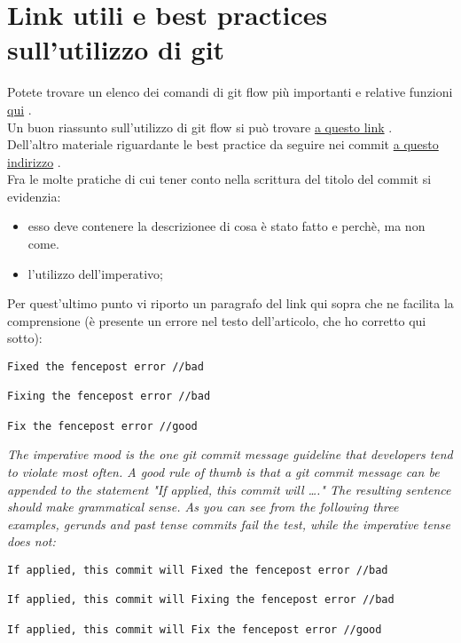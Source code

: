 \section{Link utili e best practices sull'utilizzo di git}
Potete trovare un elenco dei comandi di git flow più importanti e relative funzioni
\href{https://danielkummer.github.io/git-flow-cheatsheet/}{qui} \cite{GitFlowCheatseet}. \\
Un buon riassunto sull'utilizzo di git flow si può trovare \href{https://www.atlassian.com/git/tutorials/comparing-workflows/gitflow-workflow}{a questo link} \cite{GitFlowWorkflowTutorial}.\\
Dell'altro materiale riguardante le best practice da seguire nei commit \href{https://www.theserverside.com/video/Follow-these-git-commit-message-guidelines}{a questo indirizzo} \cite{GitCommitGuidelines}. \\
Fra le molte pratiche di cui tener conto nella scrittura del titolo del commit si evidenzia:
\begin{itemize}
\item esso deve contenere la descrizionee di cosa è stato fatto e perchè, ma non come.
\item l'utilizzo dell'imperativo;
\end{itemize}
Per quest'ultimo punto vi riporto un paragrafo del link qui sopra che ne facilita la comprensione (è presente un errore nel testo dell'articolo, che ho corretto qui sotto):
\begin{lstlisting}
Fixed the fencepost error //bad

Fixing the fencepost error //bad

Fix the fencepost error //good
\end{lstlisting}
\textit{The imperative mood is the one git commit message guideline that developers tend to violate most often. A good rule of thumb is that a git commit message can be appended to the statement "If applied, this commit will …." The resulting sentence should make grammatical sense. As you can see from the following three examples, gerunds and past tense commits fail the test, while the imperative tense does not:}
\begin{lstlisting}
If applied, this commit will Fixed the fencepost error //bad

If applied, this commit will Fixing the fencepost error //bad

If applied, this commit will Fix the fencepost error //good
\end{lstlisting}
